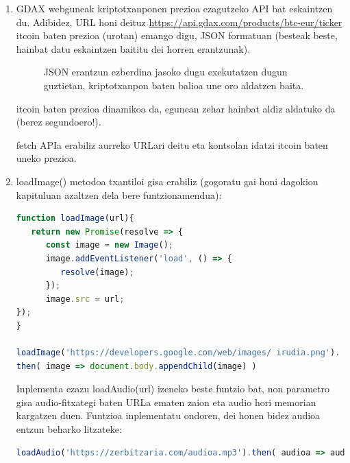 \begin{enumerate}
    \item GDAX webguneak kriptotxanponen prezioa ezagutzeko API bat eskaintzen du. Adibidez, URL honi deituz \href{https://api.gdax.com/products/btc-eur/ticker}{https://api.gdax.com/products/btc-eur/ticker} \faBitcoin itcoin  baten prezioa (\faEuro urotan) emango digu, JSON formatuan (besteak beste, hainbat datu eskaintzen baititu dei horren erantzunak).
    
    \begin{figure}[ht]
	\centering
{}
\caption{JSON erantzun ezberdina jasoko dugu exekutatzen dugun guztietan, kriptotxanpon baten balioa une oro aldatzen baita.}
\label{fig:jsonariketa1}
\end{figure}

\faBitcoin itcoin baten prezioa dinamikoa da, egunean zehar hainbat aldiz aldatuko da (berez segundoero!).

fetch APIa erabiliz aurreko URLari deitu eta kontsolan idatzi \faBitcoin itcoin baten uneko prezioa.

\item loadImage() metodoa txantiloi gisa erabiliz (gogoratu gai honi dagokion kapituluan azaltzen dela bere funtzionamendua):

\begin{lstlisting}[language=JavaScript,numbers=none]
function loadImage(url){
   return new Promise(resolve => {
      const image = new Image();
      image.addEventListener('load', () => {
         resolve(image);
      });
      image.src = url;
});
}

loadImage('https://developers.google.com/web/images/ irudia.png').
then( image => document.body.appendChild(image) )
\end{lstlisting}

Inplementa ezazu loadAudio(url) izeneko beste funtzio bat, non parametro gisa audio-fitxategi baten URLa ematen zaion eta audio hori memorian kargatzen duen. Funtzioa inplementatu ondoren, dei honen bidez audioa entzun beharko litzateke:

\begin{lstlisting}[language=JavaScript,numbers=none]
loadAudio('https://zerbitzaria.com/audioa.mp3').then( audioa => audioa.play() );
\end{lstlisting}



\end{enumerate}
